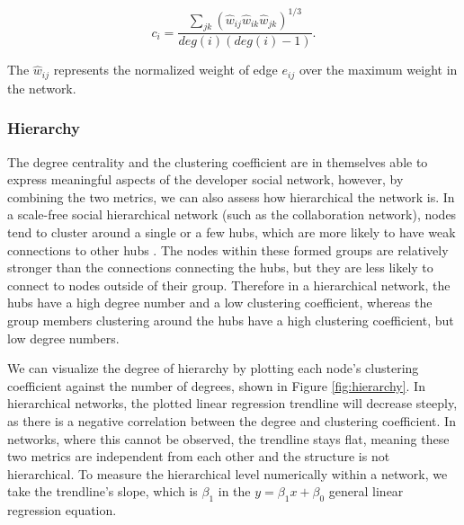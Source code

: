 \[ c_i = \frac{\sum_{jk}(\hat{w}_{ij}\hat{w}_{ik}\hat{w}_{jk})^{1/3}}{deg(i)(deg(i)-1)}. \]

The $\hat{w}_{ij}$ represents the normalized weight of edge $e_{ij}$ over the maximum weight in the network.

\subsubsection{Hierarchy}
\label{sec:hierarchy}

The degree centrality and the clustering coefficient are in themselves able to express meaningful aspects of the developer social network, however, by combining the two metrics, we can also assess how hierarchical the network is. In a scale-free social hierarchical network (such as the collaboration network), nodes tend to cluster around a single or a few hubs, which are more likely to have weak connections to other hubs \cite{ravaszHierarchicalOrganizationComplex2003, joblinEvolutionaryTrendsDeveloper2017}. The nodes within these formed groups are relatively stronger than the connections connecting the hubs, but they are less likely to connect to nodes outside of their group. Therefore in a hierarchical network, the hubs have a high degree number and a low clustering coefficient, whereas the group members clustering around the hubs have a high clustering coefficient, but low degree numbers.

We can visualize the degree of hierarchy by plotting each node's  clustering coefficient against the number of degrees, shown in Figure \ref{fig:hierarchy}. In hierarchical networks, the plotted linear regression trendline will decrease steeply, as there is a negative correlation between the degree and clustering coefficient. In networks, where this cannot be observed, the trendline stays flat, meaning these two metrics are independent from each other and the structure is not hierarchical. To measure the hierarchical level numerically within a network, we take the trendline's slope, which is $\beta_1$ in the $y=\beta_1x + \beta_0$ general linear regression equation.

